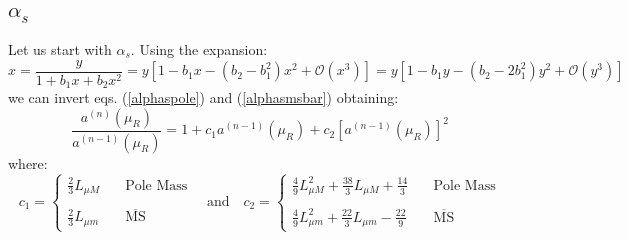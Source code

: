 \documentclass[10pt,a4paper]{article}
\begin{document}
\subsection{$\alpha_s$}
Let us start with $\alpha_s$. Using the expansion:
\begin{equation}
x=\frac{y}{1+b_1x+b_2x^2} = y\left[1-b_1x-(b_2-b_1^2)x^2 + \mathcal{O}(x^3)\right] = y \left[1-b_1y-(b_2-2b_1^2)y^2 + \mathcal{O}(y^3)\right]
\end{equation}
we can invert eqs. (\ref{alphaspole}) and (\ref{alphasmsbar}) obtaining:
\begin{equation}
\frac{a^{(n)}(\mu_R)}{a^{(n-1)}(\mu_R)} = 1 + c_1a^{(n-1)}(\mu_R) + c_2 [a^{(n-1)}(\mu_R)]^2
\end{equation}
where:
\begin{equation}
c_1 = \left\{
\begin{array}{ll}
\displaystyle \frac23 L_{\mu M}&\quad\mbox{Pole Mass}\\
\\
\displaystyle \frac23 L_{\mu m}&\quad\overline{\mbox{MS}}
\end{array}\right.\quad\mbox{and}\quad
c_2 = \left\{
\begin{array}{ll}
\displaystyle \frac49L_{\mu M}^2+\frac{38}3L_{\mu M}+\frac{14}3 &\quad\mbox{Pole Mass}\\
\\
\displaystyle \frac49L_{\mu m}^2+\frac{22}3L_{\mu m}-\frac{22}9&\quad\overline{\mbox{MS}}
\end{array}\right.
\end{equation}
\end{document}
